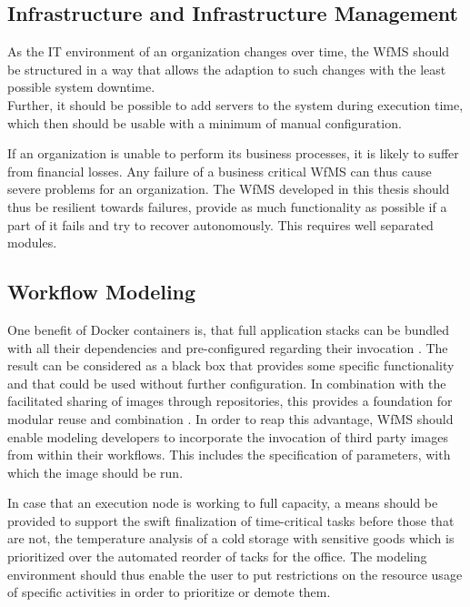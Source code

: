 \subsection*{Infrastructure and Infrastructure Management} %
  \label{ssub:infrastructure_management}

    As the IT environment of an organization changes over time, %
    the \ac{WfMS} should be structured in a way that allows the adaption to such changes with the least possible system downtime. \\
    Further, it should be possible to add servers to the system during execution time, which then should be usable with a minimum of manual configuration.

    If an organization is unable to perform its business processes, it is likely to suffer from financial losses. Any failure of a business critical \ac{WfMS} can thus cause severe problems for an organization. The \ac{WfMS} developed in this thesis should thus be resilient towards failures, \ie provide as much functionality as possible if a part of it fails and try to recover autonomously. This requires well separated modules.


\subsection*{Workflow Modeling} %
  \label{ssub:workflow_modeling}

    One benefit of Docker containers is, that full application stacks can be bundled with all their dependencies and pre-configured regarding their invocation \cite[p.~82]{Bernstein2014Containers}. The result can be considered as a black box that provides some specific functionality and that could be used without further configuration. In combination with the facilitated sharing of images through repositories, this provides a foundation for modular reuse and combination \cite[p.~6]{Boettiger2015Introduction}.
    In order to reap this advantage, \ac{WfMS} should enable modeling developers to incorporate the invocation of third party images from within their workflows. This includes the specification of parameters, with which the image should be run.

    In case that an execution node is working to full capacity, a means should be provided to support the swift finalization of time-critical tasks before those that are not, \eg the temperature analysis of a cold storage with sensitive goods which is prioritized over the automated reorder of tacks for the office. The modeling environment should thus enable the user to put restrictions on the resource usage of specific activities in order to prioritize or demote them.

